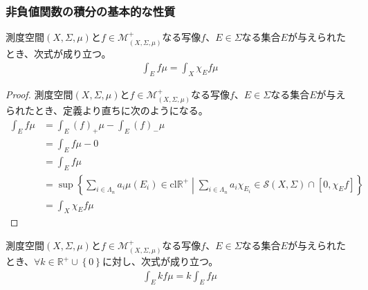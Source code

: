 \documentclass[dvipdfmx]{jsarticle}
\begin{document}
\subsubsection{非負値関数の積分の基本的な性質}%
\begin{thm}\label{4.6.1.9}
測度空間$(X,\varSigma,\mu)$と$f \in \mathcal{M}_{(X,\varSigma,\mu)}^{+}$なる写像$f$、$E \in \varSigma$なる集合$E$が与えられたとき、次式が成り立つ。
\begin{align*}
\int_{E} {f\mu} = \int_{X} {\chi_{E}f\mu}
\end{align*}
\end{thm}
\begin{proof}
測度空間$(X,\varSigma,\mu)$と$f \in \mathcal{M}_{(X,\varSigma,\mu)}^{+}$なる写像$f$、$E \in \varSigma$なる集合$E$が与えられたとき、定義より直ちに次のようになる。
\begin{align*}
\int_{E} {f\mu} &= \int_{E} {(f)_{+}\mu} - \int_{E} {(f)_{-}\mu}\\
&= \int_{E} {f\mu} - 0\\
&= \int_{E} {f\mu}\\
&= \sup\left\{ \sum_{i \in \varLambda_{n}} {a_{i}\mu\left( E_{i} \right)} \in \mathrm{cl}\mathbb{R}^{+} \middle| \sum_{i \in \varLambda_{n}} {a_{i}\chi_{E_{i}}}\in \mathcal{S}(X,\varSigma) \cap \left[ 0,\chi_{E}f \right] \right\}\\
&= \int_{X} {\chi_{E}f\mu}
\end{align*}
\end{proof}
\begin{thm}\label{4.6.1.10}
測度空間$(X,\varSigma,\mu)$と$f \in \mathcal{M}_{(X,\varSigma,\mu)}^{+}$なる写像$f$、$E \in \varSigma$なる集合$E$が与えられたとき、$\forall k \in \mathbb{R}^{+} \cup \left\{ 0 \right\}$に対し、次式が成り立つ。
\begin{align*}
\int_{E} {kf\mu} = k\int_{E} {f\mu}
\end{align*}
\end{thm}
\end{document}
